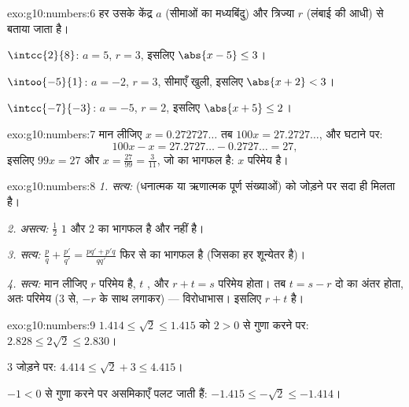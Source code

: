\begin{solution}{exo:g10:numbers:6}
हर  उसके केंद्र $a$ (सीमाओं का मध्यबिंदु) और त्रिज्या $r$ (लंबाई की
आधी) से बताया जाता है।

$\intcc{2}{8}$: $a = 5$, $r = 3$, इसलिए $\abs{x - 5} \leq 3$।

$\intoo{-5}{1}$: $a = -2$, $r = 3$, सीमाएँ खुली, इसलिए $\abs{x + 2} < 3$।

$\intcc{-7}{-3}$: $a = -5$, $r = 2$, इसलिए $\abs{x + 5} \leq 2$।
\end{solution}

\begin{solution}{exo:g10:numbers:7}
मान लीजिए $x = 0.272727\dots$ तब $100x = 27.2727\dots$, और घटाने पर:
\[
100x - x = 27.2727\dots - 0.2727\dots = 27,
\]
इसलिए $99x = 27$ और $x = \frac{27}{99} = \frac{3}{11}$, जो  का भागफल है: $x$ परिमेय है।
\end{solution}

\begin{solution}{exo:g10:numbers:8}
\emph{1. सत्य:}  (धनात्मक या ऋणात्मक पूर्ण संख्याओं) को जोड़ने पर
सदा  ही मिलता है।

\emph{2. असत्य:} $\frac{1}{2}$  $1$ और $2$ का भागफल है और  नहीं
है।

\emph{3. सत्य:} $\frac pq + \frac{p'}{q'} = \frac{pq' + p'q}{qq'}$ फिर से  का भागफल है (जिसका हर शून्येतर है)।

\emph{4. सत्य:} मान लीजिए $r$ परिमेय है, $t$ , और $r + t = s$ परिमेय
होता। तब $t = s - r$ दो  का अंतर होता, अतः परिमेय (3 से, $-r$ के
साथ लगाकर) --- विरोधाभास। इसलिए $r + t$  है।
\end{solution}

\begin{solution}{exo:g10:numbers:9}
$1.414 \leq \sqrt2 \leq 1.415$ को $2 > 0$ से गुणा करने पर: $2.828 \leq 2\sqrt2 \leq 2.830$।

$3$ जोड़ने पर: $4.414 \leq \sqrt2 + 3 \leq 4.415$।

$-1 < 0$ से गुणा करने पर असमिकाएँ पलट जाती हैं: $-1.415 \leq -\sqrt2 \leq -1.414$।
\end{solution}

